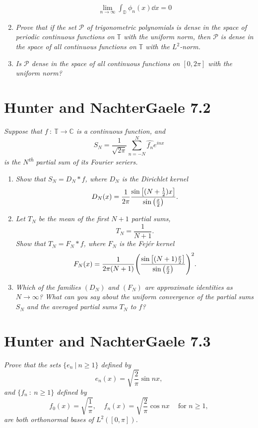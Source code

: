 \documentclass[12pt]{article}
\theoremstyle{plain}
\begin{document}
\begin{enumerate}[\bf (a)]
        \begin{align*}
            \lim_{n\rightarrow \infty}\int_\mathbb{D}\phi_n(x) \dd x = 0
        \end{align*}
    \item
        \emph{Prove that if the set $\mathcal{P}$ of trigonometric polynomials is dense in the space of periodic continuous functions on $\mathbb{T}$ with the uniform norm, then $\mathcal{P}$ is dense in the space of all continuous functions on $\mathbb{T}$ with the $L^2$-norm.}
    \item
        \emph{Is $\mathcal{P}$ dense in the space of all continuous functions on $[0, 2\pi]$ with the uniform norm?}
\end{enumerate}

\section*{Hunter and NachterGaele 7.2}
\emph{Suppose that $f\ :\ \mathbb{T} \rightarrow \mathbb{C}$ is a continuous function, and $$S_N = \frac{1}{\sqrt{2\pi}}\sum_{n=-N}^N \hat{f_n}e^{inx}$$ is the $N$\textsuperscript{th} partial sum of its Fourier seriers.}
\begin{enumerate}[\bf (a)]
    \item
        \emph{Show that $S_N = D_N * f$, where $D_N$ is the \emph{Dirichlet kernel} $$D_N(x) = \frac{1}{2\pi}\frac{\sin\qty[(N+\frac{1}{2})x]}{\sin \qty(\frac{x}{2})}.$$}
    \item
        \emph{Let $T_N$ be the mean of the first $N+1$ partial sums, $$T_N = \frac{1}{N+1}.$$  Show that $T_N = F_N * f$, where $F_N$ is the \emph{Fej\'{e}r kernel} $$F_N(x) = \frac{1}{2\pi(N + 1)}\qty(\frac{\sin\qty[(N + 1)\frac{x}{2}]}{\sin\qty(\frac{x}{2})})^2.$$}
    \item
        \emph{Which of the families $(D_N)$ and $(F_N)$ are approximate identities as $N\rightarrow \infty$?  What can you say about the uniform convergence of the partial sums $S_N$ and the averaged partial sums $T_N$ to $f$?}
\end{enumerate}

\section*{Hunter and NachterGaele 7.3}
\emph{Prove that the sets $\{e_n\ |\ n \geq 1\}$ defined by $$e_n(x) = \sqrt{\frac{2}{\pi}}\sin nx,$$ and $\{f_n\ :\ n \geq 1\}$ defined by $$f_0(x) = \sqrt{\frac{1}{\pi}},\ \ \ \ \ f_n(x) = \sqrt{\frac{2}{\pi}}\cos nx\ \ \ \ \text{ for } n \geq 1,$$ are both orthonormal bases of $L^2([0,\pi])$.} \\
\end{document}
